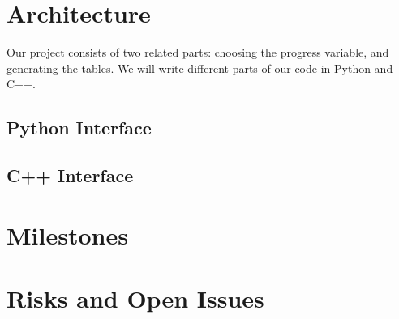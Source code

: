 \documentclass[11pt]{article}
\begin{document}
\section{Architecture}
Our project consists of two related parts: choosing the progress variable, and generating the tables. We will write different parts of our code in Python and C++. 



\subsection{Python Interface}




\subsection{C++ Interface}



\section{Milestones}




\section{Risks and Open Issues}
\end{document}
